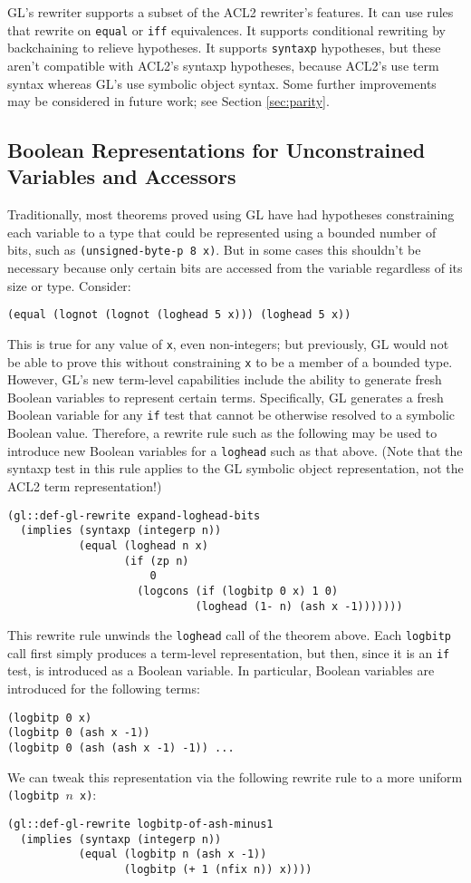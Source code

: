 \documentclass[submission,copyright,creativecommons]{eptcs}
\begin{document}
GL's rewriter supports a subset of the ACL2 rewriter's features.  It
can use rules that rewrite on \texttt{equal} or \texttt{iff}
equivalences.  It supports conditional rewriting by backchaining to
relieve hypotheses.  It supports \texttt{syntaxp} hypotheses, but
these aren't compatible with ACL2's syntaxp hypotheses, because ACL2's
use term syntax whereas GL's use symbolic object syntax.  Some further
improvements may be considered in future work; see Section
\ref{sec:parity}.


\subsection{Boolean Representations for Unconstrained Variables and Accessors}
\label{sec:vargen}
Traditionally, most theorems proved using GL have had hypotheses
constraining each variable to a type that could be represented using a
bounded number of bits, such as \texttt{(unsigned-byte-p 8 x)}.  But
in some cases this shouldn't be necessary because only certain bits
are accessed from the variable regardless of its size or type.
Consider:
\begin{verbatim}
(equal (lognot (lognot (loghead 5 x))) (loghead 5 x))
\end{verbatim}
This is true for any value of \texttt{x}, even non-integers; but
previously, GL would not be able to prove this without constraining
\texttt{x} to be a member of a bounded type.  However, GL's new
term-level capabilities include the ability to generate fresh Boolean
variables to represent certain terms.  Specifically, GL generates a
fresh Boolean variable for any \texttt{if} test that cannot be
otherwise resolved to a symbolic Boolean value.  Therefore, a rewrite
rule such as the following may be used to introduce new Boolean
variables for a \texttt{loghead} such as that above.  (Note that the
syntaxp test in this rule applies to the GL symbolic object
representation, not the ACL2 term representation!)
\begin{verbatim}
(gl::def-gl-rewrite expand-loghead-bits
  (implies (syntaxp (integerp n))
           (equal (loghead n x)
                  (if (zp n)
                      0
                    (logcons (if (logbitp 0 x) 1 0)
                             (loghead (1- n) (ash x -1)))))))
\end{verbatim}
This rewrite rule unwinds the \texttt{loghead} call of the theorem
above.  Each \texttt{logbitp} call first simply produces a term-level
representation, but then, since it is an \texttt{if} test, is
introduced as a Boolean variable.  In particular, Boolean variables
are introduced for the following terms:
\begin{verbatim}
(logbitp 0 x)
(logbitp 0 (ash x -1))
(logbitp 0 (ash (ash x -1) -1)) ...
\end{verbatim}
We can tweak this representation via the following rewrite rule to a more uniform \texttt{(logbitp $n$ x)}:
\begin{verbatim}
(gl::def-gl-rewrite logbitp-of-ash-minus1
  (implies (syntaxp (integerp n))
           (equal (logbitp n (ash x -1))
                  (logbitp (+ 1 (nfix n)) x))))
\end{verbatim}
\end{document}
